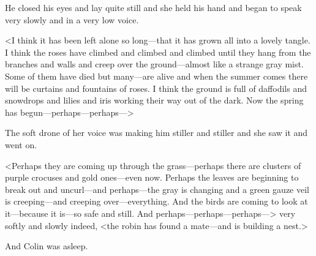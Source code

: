 He closed his eyes and lay quite still and she held his hand and began to speak very slowly and in a very low voice.

<I think it has been left alone so long—that it has grown all into a lovely tangle. I think the roses have climbed and climbed and climbed until they hang from the branches and walls and creep over the ground—almost like a strange gray mist. Some of them have died but many—are alive and when the summer comes there will be curtains and fountains of roses. I think the ground is full of daffodils and snowdrops and lilies and iris working their way out of the dark. Now the spring has begun—perhaps—perhaps—>

The soft drone of her voice was making him stiller and stiller and she saw it and went on.

<Perhaps they are coming up through the grass—perhaps there are clusters of purple crocuses and gold ones—even now. Perhaps the leaves are beginning to break out and uncurl—and perhaps—the gray is changing and a green gauze veil is creeping—and creeping over—everything. And the birds are coming to look at it—because it is—so safe and still. And perhaps—perhaps—perhaps—> very softly and slowly indeed, <the robin has found a mate—and is building a nest.>

And Colin was asleep.
